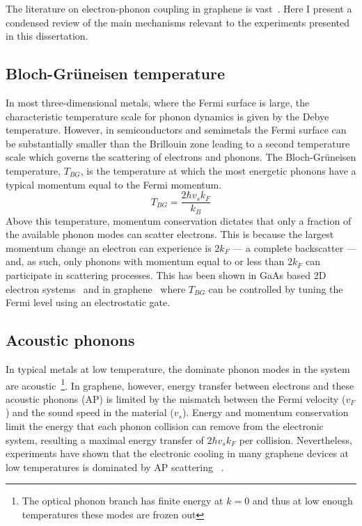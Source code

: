 The literature on electron-phonon coupling in graphene is vast~\cite{sohier_phonon-limited_2014, tielrooij_out--plane_2017, viljas_electron-phonon_2010, bistritzer_electronic_2009, schiefele_temperature_2012}. Here I present a condensed review of the main mechanisms relevant to the experiments presented in this dissertation.

\subsection{Bloch-Gr{\"u}neisen temperature}
In most three-dimensional metals, where the Fermi surface is large, the characteristic temperature scale for phonon dynamics is given by the Debye temperature. However, in semiconductors and semimetals the Fermi surface can be substantially smaller than the Brillouin zone leading to a second temperature scale which governs the scattering of electrons and phonons. The Bloch-Gr{\"u}neisen temperature, $T_{BG}$, is the temperature at which the most energetic phonons have a typical momentum equal to the Fermi momentum\cite{bloch_zum_1930, gruneisen_abhangigkeit_1933}.
\begin{equation}\label{eq:TBG}
T_{BG} = \frac{2\hbar v_sk_F}{k_B}
\end{equation}
Above this temperature, momentum conservation dictates that only a fraction of the available phonon modes can scatter electrons. This is because the largest momentum change an electron can experience is $2k_F$ --- a complete backscatter --- and, as such, only phonons with momentum equal to or less than $2k_F$ can participate in scattering processes. This has been shown in GaAs based 2D electron systems~\cite{stormer_observation_1990} and in graphene~\cite{efetov_controlling_2010} where $T_{BG}$ can be controlled by tuning the Fermi level using an electrostatic gate.

\subsection{Acoustic phonons}
In typical metals at low temperature, the dominate phonon modes in the system are acoustic~\cite{ashcroft_solid_1976}\footnote{The optical phonon branch has finite energy at $k=0$ and thus at low enough temperatures these modes are frozen out}. In graphene, however, energy transfer between electrons and these acoustic phonons (AP) is limited by the mismatch between the Fermi velocity ($v_F$) and the sound speed in the material ($v_s$). Energy and momentum conservation limit the energy that each phonon collision can remove from the electronic system, resulting a maximal energy transfer of $2\hbar v_sk_F$ per collision. Nevertheless, experiments have shown that the electronic cooling in many graphene devices at low temperatures is dominated by AP scattering~\cite{fong_measurement_2013, betz_supercollision_2013, graham_photocurrent_2013} .

